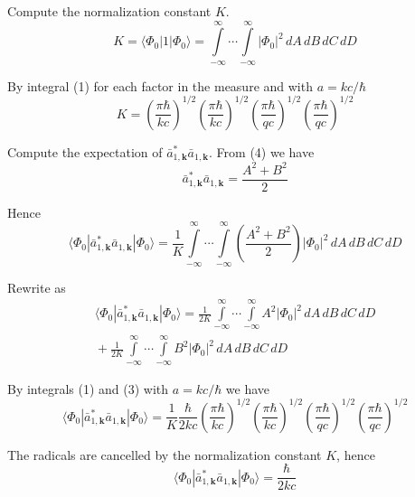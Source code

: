 Compute the normalization constant $K$.
\begin{equation*}
K=\langle\Phi_0|1|\Phi_0\rangle
=\int\limits_{-\infty}^\infty\cdots\int\limits_{-\infty}^\infty
\vert\Phi_0\vert^2\,dA\,dB\,dC\,dD
\end{equation*}

By integral (1) for each factor in the measure and with $a=kc/\hbar$
\begin{equation*}
K=
\left(\frac{\pi\hbar}{kc}\right)^{1/2}
\left(\frac{\pi\hbar}{kc}\right)^{1/2}
\left(\frac{\pi\hbar}{qc}\right)^{1/2}
\left(\frac{\pi\hbar}{qc}\right)^{1/2}
\end{equation*}

Compute the expectation of $\bar a_{1,\mathbf k}^*\bar a_{1,\mathbf k}$.
From (4) we have
\begin{equation*}
\bar a_{1,\mathbf k}^*\bar a_{1,\mathbf k}=\frac{A^2+B^2}{2}
\end{equation*}

Hence
\begin{equation*}
\langle\Phi_0|\bar a_{1,\mathbf k}^*\bar a_{1,\mathbf k}|\Phi_0\rangle
=\frac{1}{K}\int\limits_{-\infty}^\infty\cdots\int\limits_{-\infty}^\infty
\left(\frac{A^2+B^2}{2}\right)
\vert\Phi_0\vert^2\,dA\,dB\,dC\,dD
\end{equation*}

Rewrite as
\begin{multline*}
\langle\Phi_0|\bar a_{1,\mathbf k}^*\bar a_{1,\mathbf k}|\Phi_0\rangle
=\frac{1}{2K}
\int\limits_{-\infty}^\infty\cdots\int\limits_{-\infty}^\infty
A^2
\vert\Phi_0\vert^2\,dA\,dB\,dC\,dD
\\{}+
\frac{1}{2K}
\int\limits_{-\infty}^\infty\cdots\int\limits_{-\infty}^\infty
B^2
\vert\Phi_0\vert^2\,dA\,dB\,dC\,dD
\end{multline*}

By integrals (1) and (3) with $a=kc/\hbar$ we have
\begin{equation*}
\langle\Phi_0|\bar a_{1,\mathbf k}^*\bar a_{1,\mathbf k}|\Phi_0\rangle
=\frac{1}{K}\frac{\hbar}{2kc}
\left(\frac{\pi\hbar}{kc}\right)^{1/2}
\left(\frac{\pi\hbar}{kc}\right)^{1/2}
\left(\frac{\pi\hbar}{qc}\right)^{1/2}
\left(\frac{\pi\hbar}{qc}\right)^{1/2}
\end{equation*}

The radicals are cancelled by the normalization constant $K$, hence
\begin{equation*}
\langle\Phi_0|\bar a_{1,\mathbf k}^*\bar a_{1,\mathbf k}|\Phi_0\rangle=\frac{\hbar}{2kc}
\tag{5}
\end{equation*}

